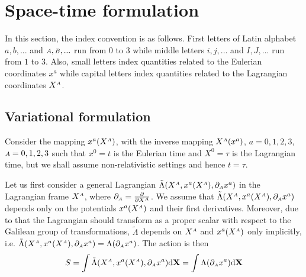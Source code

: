 \documentclass[
10pt, %
a4paper, %
oneside, %
headinclude,footinclude, %
BCOR5mm, %
]{scrartcl}
\newcommand{\XX}{\mathbf{X}}
\newcommand{\dX}{\mathrm{d}\XX}
\newcommand{\IP}[1]{{\color{Red}IP:\ \ #1}}
\newcommand{\sA}{\mathsmaller A}
\newcommand{\sB}{\mathsmaller B}
\newcommand{\pd}{\partial}
\begin{document}
\section{Space-time formulation}\label{sec.Lagr.mech}

In this section, the index convention is as follows. First letters of Latin alphabet $ a,b,... 
$ and $ 
\sA,\sB,... $ run from $ 0 $ to $ 3 $  while middle letters $ i,j,... $ and $ I,J,... $ run from $ 
1 $ to $ 3 $. Also, small letters index quantities related to the Eulerian coordinates $ x^a $ 
while capital letters index quantities related to the Lagrangian coordinates $ X^\sA $.

\subsection{Variational formulation}\label{sec.variation}

Consider the mapping $x^a(X^\sA)$, with the inverse mapping $ X^\sA(x^a) $,  $a=0,1,2,3$, 
$\sA=0,1,2,3$ such that $x^0=t$ is the Eulerian 
time and $X^0 = \tau$ is the Lagrangian time, but we shall assume non-relativistic settings and 
hence $t=\tau$. 

Let us first consider a general Lagrangian $ \tilde{\Lambda}(X^\sA,x^a(X^\sA),\pd_\sA x^a) $ in the 
Lagrangian 
frame $ X^\sA $, where $ \pd_\sA = \frac{\pd}{\pd X^\sA} $. We assume that $ 
\tilde{\Lambda}(X^\sA,x^a(X^\sA),\pd_\sA x^a) $ depends only on the 
potentials 
$ x^a(X^\sA) $ and their first derivatives. Moreover, due to that the Lagrangian should transform 
as a proper scalar with respect to the Galilean group of transformations, $ \tilde{\Lambda} $ 
depends on $ X^\sA $ and $ x^a(X^\sA) $ 
only implicitly, i.e.
$ \tilde{\Lambda}(X^\sA,x^a(X^\sA),\pd_\sA x^a) = \Lambda(\pd_\sA x^a) $.
 The action is then
\begin{equation}
S = \int \tilde{\Lambda}(X^\sA,x^a(X^\sA),\pd_\sA x^a)\dX = \int \Lambda(\pd_\sA x^a)\dX
\end{equation}
\end{document}
